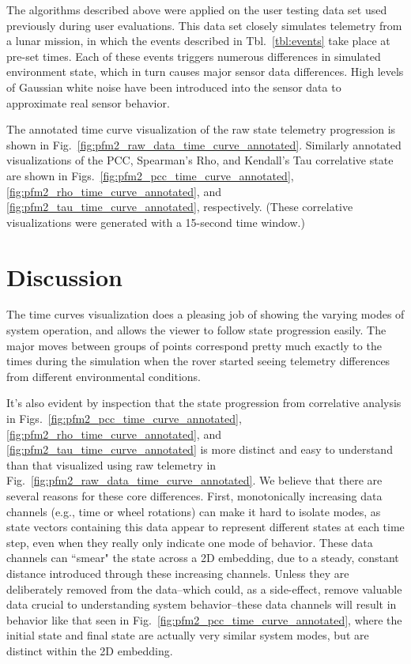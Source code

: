 The algorithms described above were applied on the user testing data set used previously during user evaluations. This data set closely simulates telemetry from a lunar mission, in which the events described in Tbl.~\ref{tbl:events} take place at pre-set times. Each of these events triggers numerous differences in simulated environment state, which in turn causes major sensor data differences. High levels of Gaussian white noise have been introduced into the sensor data to approximate real sensor behavior.

The annotated time curve visualization of the raw state telemetry progression is shown in Fig.~\ref{fig:pfm2_raw_data_time_curve_annotated}. Similarly annotated visualizations of the PCC, Spearman's Rho, and Kendall's Tau correlative state are shown in Figs.~\ref{fig:pfm2_pcc_time_curve_annotated}, \ref{fig:pfm2_rho_time_curve_annotated}, and \ref{fig:pfm2_tau_time_curve_annotated}, respectively. (These correlative visualizations were generated with a 15-second time window.)

\section{Discussion}

The time curves visualization does a pleasing job of showing the varying modes of system operation, and allows the viewer to follow state progression easily. The major moves between groups of points correspond pretty much exactly to the times during the simulation when the rover started seeing telemetry differences from different environmental conditions.

It's also evident by inspection that the state progression from correlative analysis in Figs.~\ref{fig:pfm2_pcc_time_curve_annotated}, \ref{fig:pfm2_rho_time_curve_annotated}, and \ref{fig:pfm2_tau_time_curve_annotated} is more distinct and easy to understand than that visualized using raw telemetry in Fig.~\ref{fig:pfm2_raw_data_time_curve_annotated}. We believe that there are several reasons for these core differences. First, monotonically increasing data channels (e.g., time or wheel rotations) can make it hard to isolate modes, as state vectors containing this data appear to represent different states at each time step, even when they really only indicate one mode of behavior. These data channels can ``smear" the state across a 2D embedding, due to a steady, constant distance introduced through these increasing channels. Unless they are deliberately removed from the data--which could, as a side-effect, remove valuable data crucial to understanding system behavior--these data channels will result in behavior like that seen in Fig.~\ref{fig:pfm2_pcc_time_curve_annotated}, where the initial state and final state are actually very similar system modes, but are distinct within the 2D embedding.

